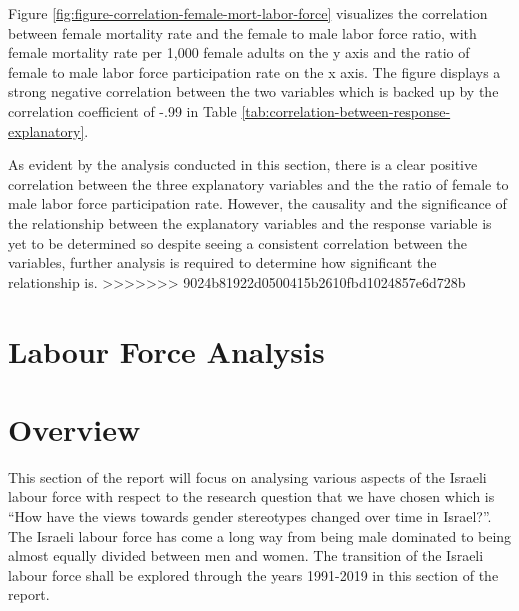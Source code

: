 \documentclass[11pt,a4paper,]{article}
\begin{document}
Figure \ref{fig:figure-correlation-female-mort-labor-force} visualizes the correlation between female mortality rate and the female to male labor force ratio, with female mortality rate per 1,000 female adults on the y axis and the ratio of female to male labor force participation rate on the x axis. The figure displays a strong negative correlation between the two variables which is backed up by the correlation coefficient of -.99 in Table \ref{tab:correlation-between-response-explanatory}.

As evident by the analysis conducted in this section, there is a clear positive correlation between the three explanatory variables and the the ratio of female to male labor force participation rate. However, the causality and the significance of the relationship between the explanatory variables and the response variable is yet to be determined so despite seeing a consistent correlation between the variables, further analysis is required to determine how significant the relationship is.
>>>>>>> 9024b81922d0500415b2610fbd1024857e6d728b

\section*{Labour Force Analysis}

\hypertarget{overview}{%
\section{Overview}\label{overview}}

This section of the report will focus on analysing various aspects of the Israeli labour force with respect to the research question that we have chosen which is ``How have the views towards gender stereotypes changed over time in Israel?''. The Israeli labour force has come a long way from being male dominated to being almost equally divided between men and women. The transition of the Israeli labour force shall be explored through the years 1991-2019 in this section of the report.
\end{document}
